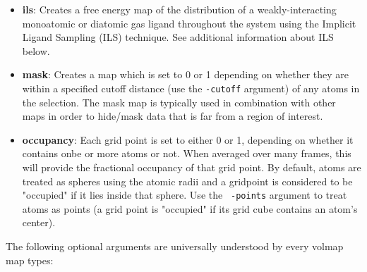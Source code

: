 \begin{itemize}
  
  \item {\bf ils}: Creates a free energy map of the distribution of
  a weakly-interacting monoatomic or diatomic gas ligand throughout the
  system using the Implicit Ligand Sampling (ILS) technique.
  See additional information about ILS below.

  \item {\bf mask}: Creates a map which is set to 0 or 1 depending on whether
  they are within a specified cutoff distance (use the {\tt -cutoff} argument)
  of any atoms in the selection. The mask map is typically used in combination
  with other maps in order to hide/mask data that is far from a region of
  interest.

  \item {\bf occupancy}: Each grid point is set to either 0 or 1, depending on
  whether it contains onbe or more atoms or not. When averaged over many frames,
  this will provide the fractional occupancy of that grid point. By default,
  atoms are treated as spheres using the atomic radii and a gridpoint is
  considered to be "occupied" if it lies inside that sphere. Use the {\tt
  -points} argument to treat atoms as points (a grid point is "occupied" if its
  grid cube contains an atom's center).

\end{itemize} 

The following optional arguments are universally understood by every volmap map types:   
      
